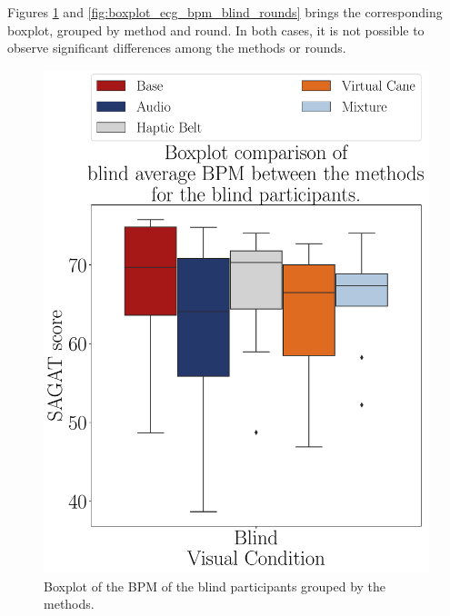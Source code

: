 %

% 
%

Figures \ref{fig:boxplot_ecg_bpm_blind_scene} and \ref{fig:boxplot_ecg_bpm_blind_rounds} brings the corresponding boxplot, grouped by method and round. In both cases, it is not possible to observe significant differences among the methods or rounds.

\begin{figure}[!htb]
    \centering
    \includegraphics[width = 0.75\linewidth]{Resultados/ECG/Figuras/pdf/boxplot_ecg_bpm_blind_scene.pdf}
    \caption{Boxplot of the BPM of the blind participants grouped by the methods.}
    \label{fig:boxplot_ecg_bpm_blind_scene}
\end{figure}

